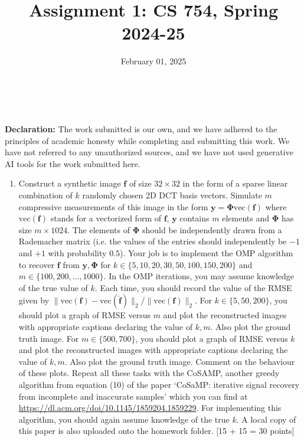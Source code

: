 \documentclass{article}
\title{Assignment 1: CS 754, Spring 2024-25}
\author{
\IEEEauthorblockN{
    \begin{tabular}{cccc}
        \begin{minipage}[t]{0.23\textwidth}
            \centering
            Amitesh Shekhar\\
            IIT Bombay\\
            22b0014@iitb.ac.in
        \end{minipage} & 
        \begin{minipage}[t]{0.23\textwidth}
            \centering
            Anupam Rawat\\
            IIT Bombay\\
            22b3982@iitb.ac.in
        \end{minipage} & 
        \begin{minipage}[t]{0.23\textwidth}
            \centering
            Toshan Achintya Golla\\
            IIT Bombay\\
            22b2234@iitb.ac.in
        \end{minipage} \\
        \\ 
    \end{tabular}
}
}
\date{February 01, 2025}
\begin{document}
\maketitle

\\
\\

\textbf{Declaration:} The work submitted is our own, and
we have adhered to the principles of academic honesty while completing and submitting this work. We have not
referred to any unauthorized sources, and we have not used generative AI tools for the work submitted here.

\begin{enumerate}
    \item Construct a synthetic image $\boldsymbol{f}$ of size $32 \times 32$ in the form of a sparse linear combination of $k$ randomly chosen 2D DCT basis vectors. Simulate $m$ compressive measurements of this image in the form $\boldsymbol{y} = \boldsymbol{\Phi} \text{vec}(\boldsymbol{f})$ where $\text{vec}(\boldsymbol{f})$ stands for a vectorized form of $\boldsymbol{f}$, $\boldsymbol{y}$ contains $m$ elements and $\boldsymbol{\Phi}$ has size $m \times 1024$. The elements of $\boldsymbol{\Phi}$ should be independently drawn from a Rademacher matrix (i.e. the values of the entries should independently be $-1$ and $+1$ with probability $0.5$). Your job is to implement the OMP algorithm to recover $\boldsymbol{f}$ from $\boldsymbol{y}, \boldsymbol{\Phi}$ for $k \in \{5,10,20,30,50,100,150,200\}$ and $m \in \{100,200,...,1000\}$. In the OMP iterations, you may assume knowledge of the true value of $k$. Each time, you should record the value of the RMSE given by $\|\text{vec}(\boldsymbol{f}) - \text{vec}(\boldsymbol{\hat{f}})\|_2/\|\text{vec}(\boldsymbol{f})\|_2$. For $k \in \{5,50,200\}$, you should plot a graph of RMSE versus $m$ and plot the reconstructed images with appropriate captions declaring the value of $k,m$. Also plot the ground truth image. For $m \in \{500,700\}$, you should plot a graph of RMSE versus $k$ and plot the reconstructed images with appropriate captions declaring the value of $k,m$. Also plot the ground truth image. Comment on the behaviour of these plots. Repeat all these tasks with the CoSAMP, another greedy algorithm from equation (10) of the paper `CoSaMP: iterative signal recovery from incomplete and inaccurate samples' which you can find at \url{https://dl.acm.org/doi/10.1145/1859204.1859229}. For implementing this algorithm, you should again assume knowledge of the true $k$. A local copy of this paper is also uploaded onto the homework folder. \textsf{[15 + 15 = 30 points]}
\end{enumerate}
    \\
\end{document}
